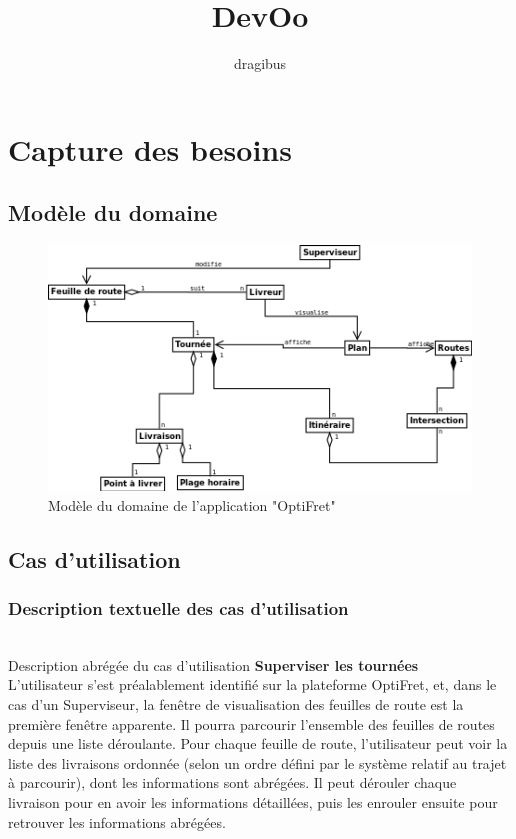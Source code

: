 \documentclass[a4paper]{report}
\begin{document}
\title{DevOo}
\author{dragibus}

\maketitle

\tableofcontents


\chapter{Capture des besoins}

\section{Modèle du domaine}

\begin{figure}[h]
    \centering
    \includegraphics[scale = 0.7]{images/modele-domaine}
    \caption{Modèle du domaine de l'application "OptiFret"}
\end{figure}

\section{Cas d'utilisation}

\subsection{Description textuelle des cas d'utilisation}
~~\\

Description abrégée du cas d’utilisation \textbf{Superviser les tournées}\\

L’utilisateur s’est préalablement identifié sur la plateforme OptiFret, et,
dans le cas d’un Superviseur, la fenêtre de visualisation des feuilles de route
est la première fenêtre apparente. Il pourra parcourir l’ensemble des feuilles
de routes depuis une liste déroulante. Pour chaque feuille de route,
l’utilisateur peut voir la liste des livraisons ordonnée (selon un ordre défini
par le système relatif au trajet à parcourir), dont les informations sont
abrégées. Il peut dérouler chaque livraison pour en avoir les informations
détaillées, puis les enrouler ensuite pour retrouver les informations abrégées.
\end{document}
